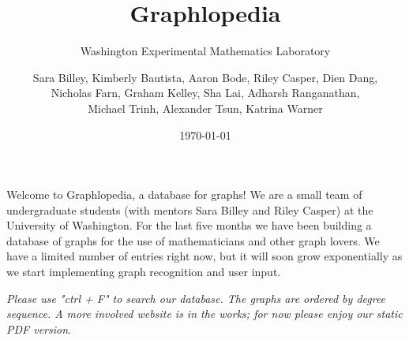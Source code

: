 \documentclass{scrartcl}
\begin{document}
\title{\Huge Graphlopedia}
\subtitle{Washington Experimental Mathematics Laboratory}
\author{Sara Billey, Kimberly Bautista, Aaron Bode, Riley Casper, Dien Dang, \\Nicholas
  Farn, Graham Kelley, Sha Lai, Adharsh Ranganathan, \\Michael
  Trinh, Alexander Tsun, Katrina Warner}


\date{\today}
\maketitle

{\centering
Welcome to Graphlopedia, a database for graphs! We are a small team of undergraduate students (with mentors Sara Billey and Riley Casper) at the University of Washington. For the last five months we have been building a database of graphs for the use of mathematicians and other graph lovers. We have a limited number of entries right now, but it will soon grow exponentially as we start implementing graph recognition and user input.


\textit{Please use "ctrl + F" to search our database. The graphs are ordered by degree sequence. A more involved website is in the works; for now please enjoy our static PDF version}. \par
}


\end{document}
